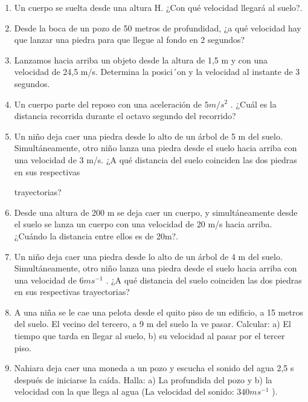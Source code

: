 \begin{enumerate}
\item Un cuerpo se suelta desde una altura H. ¿Con qué velocidad llegará al suelo?.

\item Desde la boca de un pozo de 50 metros de profundidad, ¿a qué velocidad hay que lanzar una
 piedra para que llegue al fondo 
en 2 segundos?

\item Lanzamos hacia arriba un objeto desde la altura de 1,5 m y con una velocidad de 24,5 m/s.
 Determina la posici´on y la 
velocidad al instante de 3 segundos.


\item  Un cuerpo parte del reposo con una aceleración de $5 m/s^2$
.
 ¿Cuál es la distancia recorrida durante el octavo segundo 
del recorrido?

\item  Un niño deja caer una piedra desde lo alto de un árbol de 5
 m del suelo. Simultáneamente, otro niño lanza una piedra 
desde el suelo hacia arriba con una
 velocidad de 3 m/s. ¿A qué distancia del suelo coinciden las dos piedras en sus respectivas

trayectorias?

\item  Desde una altura de 200
 m se deja caer un cuerpo, y simultáneamente desde el suelo se lanza un cuerpo con una
 velocidad 
de 20 m/s hacia arriba. ¿Cuándo la distancia entre ellos es de 20m?.


\item Un niño deja caer una piedra desde lo alto de un árbol de 4 m del suelo. Simultáneamente,
 otro niño lanza una piedra desde 
el suelo hacia arriba con una velocidad de $6 ms^{−1}$
. ¿A qué distancia del
 suelo coinciden las dos piedras en sus respectivas 
trayectorias?

\item A una niña se le cae una pelota desde el quito piso de un edificio, a 15 metros del suelo.
 El vecino del tercero, a 9 m 
del suelo la ve pasar. Calcular: a) El tiempo que tarda en llegar al suelo, b) su
 velocidad al pasar por el tercer piso.


\item Nahiara deja caer una moneda a un pozo y escucha el sonido del agua 2,5 s después de
 iniciarse la caída. Halla: a) La 
profundida del pozo y b) la velocidad con la que llega al agua (La velocidad
 del sonido: $340ms^{−1}$
).

\end{enumerate}
